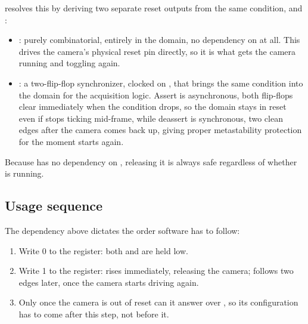  resolves this by deriving two separate reset outputs from the same condition,  and :

\begin{itemize}
    \item {}: purely combinatorial, entirely in the  domain, no dependency on  at all. This drives the camera's physical reset pin directly, so it is what gets the camera running and  toggling again.
    \item {}: a two-flip-flop synchronizer, clocked on , that brings the same condition into the  domain for the acquisition logic. Assert is asynchronous, both flip-flops clear immediately when the condition drops, so the domain stays in reset even if  stops ticking mid-frame, while deassert is synchronous, two clean  edges after the camera comes back up, giving proper metastability protection for the moment  starts again.
\end{itemize}

Because  has no dependency on , releasing it is always safe regardless of whether  is running.

\subsection{Usage sequence}

The dependency above dictates the order software has to follow:

\begin{enumerate}
    \item Write 0 to the  register: both  and  are held low.
    \item Write 1 to the  register:  rises immediately, releasing the camera;  follows two  edges later, once the camera starts driving  again.
    \item Only once the camera is out of reset can it answer over , so its configuration has to come after this step, not before it.
\end{enumerate}

\label{sec:fpgalix-acquisition-core}

